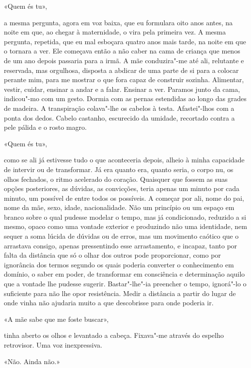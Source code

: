 «Quem és tu»,

a mesma pergunta, agora em voz baixa, que eu formulara oito anos antes,
na noite em que, ao chegar à maternidade, o vira pela primeira vez. A
mesma pergunta, repetida, que eu mal esboçara quatro anos mais tarde, na
noite em que o tornara a ver. Ele começava então a não caber na cama de
criança que menos de um ano depois passaria para a irmã. A mãe
conduzira"-me até ali, relutante e reservada, mas orgulhosa, disposta a
abdicar de uma parte de si para a colocar perante mim, para me mostrar o
que fora capaz de construir sozinha. Alimentar, vestir, cuidar, ensinar
a andar e a falar. Ensinar a ver. Paramos junto da cama, indicou"-mo com
um gesto. Dormia com as pernas estendidas ao longo das grades de
madeira. A transpiração colava"-lhe os cabelos à testa. Afastei"-lhos
com a ponta dos dedos. Cabelo castanho, escurecido da umidade,
recortado contra a pele pálida e o rosto magro.

«Quem és tu»,

como se ali já estivesse tudo o que aconteceria depois, alheio à minha
capacidade de intervir ou de transformar. Já era quanto era, quanto
seria, o corpo nu, os olhos fechados, o ritmo acelerado do coração.
Quaisquer que fossem as suas opções posteriores, as dúvidas, as
convicções, teria apenas um minuto por cada minuto, um possível de entre
todos os possíveis. A começar por ali, nome do pai, nome da mãe, sexo,
idade, nacionalidade. Não um princípio ou um espaço em branco sobre o
qual pudesse modelar o tempo, mas já condicionado, reduzido a si mesmo,
opaco como uma vontade exterior e produzindo não uma identidade, nem
sequer a soma lúcida de dúvidas ou de erros, mas um movimento caótico
que o arrastava consigo, apenas pressentindo esse arrastamento, e
incapaz, tanto por falta da distância que só o olhar dos outros pode
proporcionar, como por ignorância dos termos segundo os quais poderia
converter o conhecimento em domínio, o saber em poder, de transformar em
consciência e determinação aquilo que a vontade lhe pudesse sugerir.
Bastar"-lhe"-ia preencher o tempo, ignorá"-lo o suficiente para não lhe
opor resistência. Medir a distância a partir do lugar de onde vinha não
ajudaria muito a que descobrisse para onde poderia ir.

«A mãe sabe que me foste buscar»,

tinha aberto os olhos e levantado a cabeça. Fixava"-me através do
espelho retrovisor. Uma voz inexpressiva.

«Não. Ainda não.»

